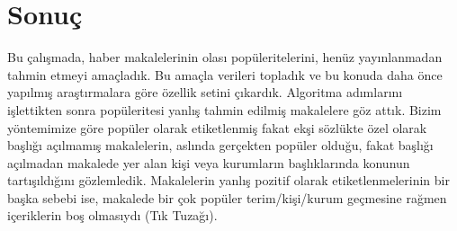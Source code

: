 \documentclass[conference]{IEEEtran}
\begin{document}

\section{Sonuç}
Bu çalışmada, haber makalelerinin olası popüleritelerini, henüz yayınlanmadan tahmin etmeyi amaçladık. Bu amaçla verileri topladık ve bu konuda daha önce yapılmış araştırmalara göre özellik setini çıkardık. Algoritma adımlarını işlettikten sonra popüleritesi yanlış tahmin edilmiş makalelere göz attık. Bizim yöntemimize göre popüler olarak etiketlenmiş fakat ekşi sözlükte özel olarak başlığı açılmamış makalelerin, aslında gerçekten popüler olduğu, fakat başlığı açılmadan makalede yer alan kişi veya kurumların başlıklarında konunun tartışıldığını gözlemledik. Makalelerin yanlış pozitif olarak etiketlenmelerinin bir başka sebebi ise, makalede bir çok popüler terim/kişi/kurum geçmesine rağmen içeriklerin boş olmasıydı (Tık Tuzağı).

%
%




%
%
\end{document}
